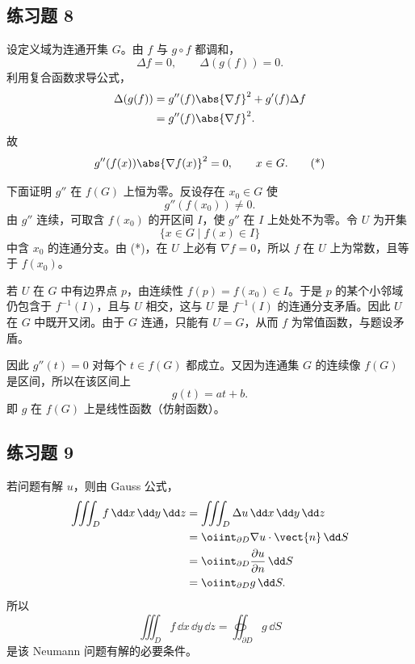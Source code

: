 \subsection*{练习题 8}
\begin{xsolution}
设定义域为连通开集 $G$。由 $f$ 与 $g\circ f$ 都调和，
\[
  \Delta f=0,
  \qquad
  \Delta(g(f))=0.
\]
利用复合函数求导公式，
\begin{align*}
  \Delta(g(f))
  &=g''(f)\abs{\nabla f}^2+g'(f)\Delta f\\
  &=g''(f)\abs{\nabla f}^2.
\end{align*}
故
\begin{equation}
  g''(f(x))\abs{\nabla f(x)}^2=0,
  \qquad x\in G.
  \tag{*}
\end{equation}

下面证明 $g''$ 在 $f(G)$ 上恒为零。反设存在 $x_0\in G$ 使
\[
  g''(f(x_0))\ne0.
\]
由 $g''$ 连续，可取含 $f(x_0)$ 的开区间 $I$，使 $g''$ 在 $I$ 上处处不为零。令 $U$ 为开集
\[
  \{x\in G\mid f(x)\in I\}
\]
中含 $x_0$ 的连通分支。由 (*)，在 $U$ 上必有 $\nabla f=0$，所以 $f$ 在 $U$ 上为常数，且等于 $f(x_0)$。

若 $U$ 在 $G$ 中有边界点 $p$，由连续性 $f(p)=f(x_0)\in I$。于是 $p$ 的某个小邻域仍包含于 $f^{-1}(I)$，且与 $U$ 相交，这与 $U$ 是 $f^{-1}(I)$ 的连通分支矛盾。因此 $U$ 在 $G$ 中既开又闭。由于 $G$ 连通，只能有 $U=G$，从而 $f$ 为常值函数，与题设矛盾。

因此 $g''(t)=0$ 对每个 $t\in f(G)$ 都成立。又因为连通集 $G$ 的连续像 $f(G)$ 是区间，所以在该区间上
\[
  g(t)=at+b.
\]
即 $g$ 在 $f(G)$ 上是线性函数（仿射函数）。
\end{xsolution}

\subsection*{练习题 9}
\begin{xsolution}
若问题有解 $u$，则由 Gauss 公式，
\begin{align*}
  \iiint_D f\,\dd x\,\dd y\,\dd z
  &=\iiint_D\Delta u\,\dd x\,\dd y\,\dd z\\
  &=\oiint_{\partial D}\nabla u\cdot\vect{n}\,\dd S\\
  &=\oiint_{\partial D}\frac{\partial u}{\partial n}\,\dd S\\
  &=\oiint_{\partial D}g\,\dd S.
\end{align*}
所以
\[
  \boxed{
  \iiint_D f\,\dd x\,\dd y\,\dd z
  =\oiint_{\partial D}g\,\dd S
  }
\]
是该 Neumann 问题有解的必要条件。
\end{xsolution}

